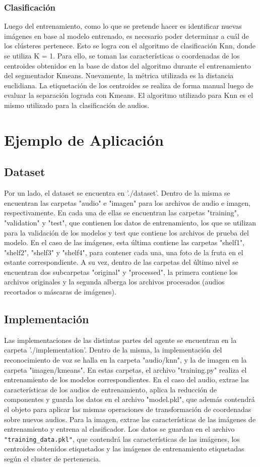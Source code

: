 \documentclass[a4paper, 12pt]{article}
\begin{document}
\subsubsection{Clasificación}

Luego del entrenamiento, como lo que se pretende hacer es identificar nuevas imágenes en base al modelo entrenado, es necesario poder determinar a cuál de los clústeres pertenece. Esto se logra con el algoritmo de clasificación Knn, donde se utiliza K = 1. Para ello, se toman las características o coordenadas de los centroides obtenidos en la base de datos del algoritmo durante el entrenamiento del segmentador Kmeans. Nuevamente, la métrica utilizada es la distancia euclidiana. La etiquetación de los centroides se realiza de forma manual luego de evaluar la separación lograda con Kmeans. El algoritmo utilizado para Knn es el mismo utilizado para la clasificación de audios.

\section{Ejemplo de Aplicación}
\subsection{Dataset}
Por un lado, el dataset se encuentra en './dataset'. Dentro de la misma se encuentran las carpetas "audio" e "imagen" para los archivos de audio e imagen, respectivamente. En cada una de ellas se encuentran las carpetas "training", "validation" y "test", que contienen los datos de entrenamiento, los que se utilizan para la validación de los modelos y test que contiene los archivos de prueba del modelo. En el caso de las imágenes, esta última contiene las carpetas "shelf1", "shelf2", "shelf3" y "shelf4", para contener cada una, una foto de la fruta en el estante correspondiente. A su vez, dentro de las carpetas del último nivel se encuentran dos subcarpetas "original" y "processed", la primera contiene los archivos originales y la segunda alberga los archivos procesados (audios recortados o máscaras de imágenes).
\subsection{Implementación}
Las implementaciones de las distintas partes del agente se encuentran en la carpeta './implementation'. Dentro de la misma, la implementación del reconocimiento de voz se halla en la carpeta "audio/knn", y la de imagen en la carpeta "imagen/kmeans". En estas carpetas, el archivo "training.py" realiza el entrenamiento de los modelos correspondientes. En el caso del audio, extrae las características de los audios de entrenamiento, aplica la reducción de componentes y guarda los datos en el archivo "model.pkl", que además contendrá el objeto para aplicar las mismas operaciones de transformación de coordenadas sobre nuevos audios. Para la imagen, extrae las características de las imágenes de entrenamiento y entrena al clasificador. Los datos se guardan en el archivo \texttt{"training\_data.pkl"}, que contendrá las características de las imágenes, los centroides obtenidos etiquetados y las imágenes de entrenamiento etiquetadas según el cluster de pertenencia.
\end{document}
